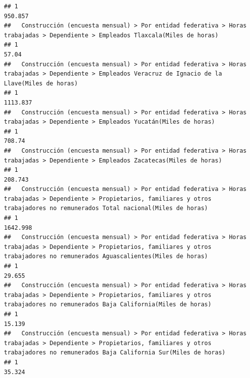 \documentclass[
]{article}
\begin{document}
\begin{verbatim}
## 1                                                                                                                           950.857
##   Construcción (encuesta mensual) > Por entidad federativa > Horas trabajadas > Dependiente > Empleados Tlaxcala(Miles de horas) 
## 1                                                                                                                           57.04
##   Construcción (encuesta mensual) > Por entidad federativa > Horas trabajadas > Dependiente > Empleados Veracruz de Ignacio de la Llave(Miles de horas) 
## 1                                                                                                                                               1113.837
##   Construcción (encuesta mensual) > Por entidad federativa > Horas trabajadas > Dependiente > Empleados Yucatán(Miles de horas) 
## 1                                                                                                                         708.74
##   Construcción (encuesta mensual) > Por entidad federativa > Horas trabajadas > Dependiente > Empleados Zacatecas(Miles de horas) 
## 1                                                                                                                          208.743
##   Construcción (encuesta mensual) > Por entidad federativa > Horas trabajadas > Dependiente > Propietarios, familiares y otros trabajadores no remunerados Total nacional(Miles de horas) 
## 1                                                                                                                                                                                 1642.998
##   Construcción (encuesta mensual) > Por entidad federativa > Horas trabajadas > Dependiente > Propietarios, familiares y otros trabajadores no remunerados Aguascalientes(Miles de horas) 
## 1                                                                                                                                                                                   29.655
##   Construcción (encuesta mensual) > Por entidad federativa > Horas trabajadas > Dependiente > Propietarios, familiares y otros trabajadores no remunerados Baja California(Miles de horas) 
## 1                                                                                                                                                                                    15.139
##   Construcción (encuesta mensual) > Por entidad federativa > Horas trabajadas > Dependiente > Propietarios, familiares y otros trabajadores no remunerados Baja California Sur(Miles de horas) 
## 1                                                                                                                                                                                        35.324

\end{verbatim}
\end{document}
